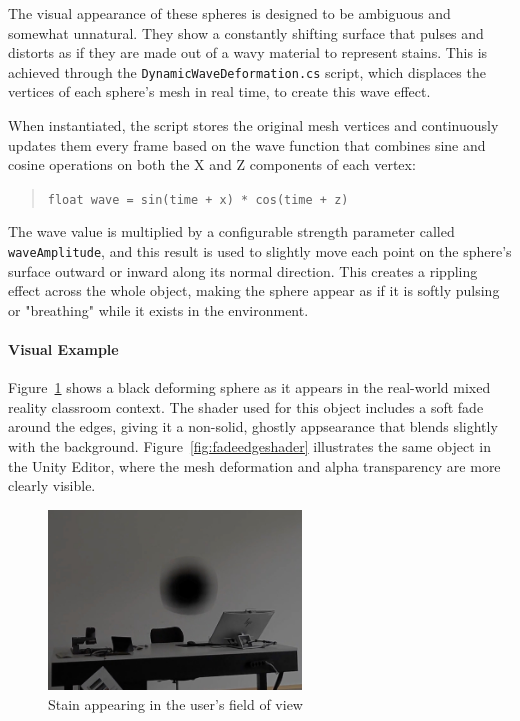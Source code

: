 \vspace{1em}

The visual appearance of these spheres is designed to be ambiguous and somewhat unnatural. They show a constantly shifting surface that pulses and distorts as if they are made out of a wavy material to represent stains. This is achieved through the \texttt{DynamicWaveDeformation.cs} script, which displaces the vertices of each sphere's mesh in real time, to create this wave effect.

When instantiated, the script stores the original mesh vertices and continuously updates them every frame based on the wave function that combines sine and cosine operations on both the X and Z components of each vertex:

\begin{quote}
\texttt{float wave = sin(time + x) * cos(time + z)}
\end{quote}

The wave value is multiplied by a configurable strength parameter called \texttt{waveAmplitude}, and this result is used to slightly move each point on the sphere’s surface outward or inward along its normal direction. This creates a rippling effect across the whole object, making the sphere appear as if it is softly pulsing or "breathing" while it exists in the environment.


\paragraph{Visual Example}
Figure~\ref{fig:stain} shows a black deforming sphere as it appears in the real-world mixed reality classroom context. The shader used for this object includes a soft fade around the edges, giving it a non-solid, ghostly appsearance that blends slightly with the background. Figure~\ref{fig:fadeedgeshader} illustrates the same object in the Unity Editor, where the mesh deformation and alpha transparency are more clearly visible.

\begin{figure}[h!] 
    \centering 
    \includegraphics[width=0.6\textwidth]{../../Figures/stain-video.jpg} 
    \caption{Stain appearing in the user's field of view} 
    \label{fig:stain} 
\end{figure}


